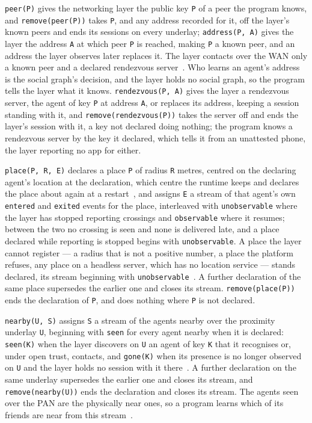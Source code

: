 \verb|peer(P)| gives the networking layer the public key \verb|P| of a peer the program knows, and \verb|remove(peer(P))| takes \verb|P|, and any address recorded for it, off the layer's known peers and ends its sessions on every underlay; \verb|address(P, A)| gives the layer the address \verb|A| at which peer \verb|P| is reached, making \verb|P| a known peer, and an address the layer observes later replaces it.  The layer contacts over the WAN only a known peer and a declared rendezvous server~\cite{bachar2026networking}. Who learns an agent's address is the social graph's decision, and the layer holds no social graph, so the program tells the layer what it knows. \verb|rendezvous(P, A)| gives the layer a rendezvous server, the agent of key \verb|P| at address \verb|A|, or replaces its address, keeping a session standing with it, and \verb|remove(rendezvous(P))| takes the server off and ends the layer's session with it, a key not declared doing nothing; the program knows a rendezvous server by the key it declared, which tells it from an unattested phone, the layer reporting no app for either.

\verb|place(P, R, E)| declares a place \verb|P| of radius \verb|R| metres, centred on the declaring agent's location at the declaration, which centre the runtime keeps and declares the place about again at a restart~\cite{shapiro2026implementing}, and assigns \verb|E| a stream of that agent's own \verb|entered| and \verb|exited| events for the place, interleaved with \verb|unobservable| where the layer has stopped reporting crossings and \verb|observable| where it resumes; between the two no crossing is seen and none is delivered late, and a place declared while reporting is stopped begins with \verb|unobservable|.  A place the layer cannot register --- a radius that is not a positive number, a place the platform refuses, any place on a headless server, which has no location service --- stands declared, its stream beginning with \verb|unobservable|~\cite{bachar2026networking,shapiro2026implementing}. A further declaration of the same place supersedes the earlier one and closes its stream. \verb|remove(place(P))| ends the declaration of \verb|P|, and does nothing where \verb|P| is not declared.

\verb|nearby(U, S)| assigns \verb|S| a stream of the agents nearby over the proximity underlay \verb|U|, beginning with \verb|seen| for every agent nearby when it is declared: \verb|seen(K)| when the layer discovers on \verb|U| an agent of key \verb|K| that it recognises or, under open trust, contacts, and \verb|gone(K)| when its presence is no longer observed on \verb|U| and the layer holds no session with it there~\cite{bachar2026networking}.  A further declaration on the same underlay supersedes the earlier one and closes its stream, and \verb|remove(nearby(U))| ends the declaration and closes its stream.  The agents seen over the PAN are the physically near ones, so a program learns which of its friends are near from this stream~\cite{bachar2026networking}.

